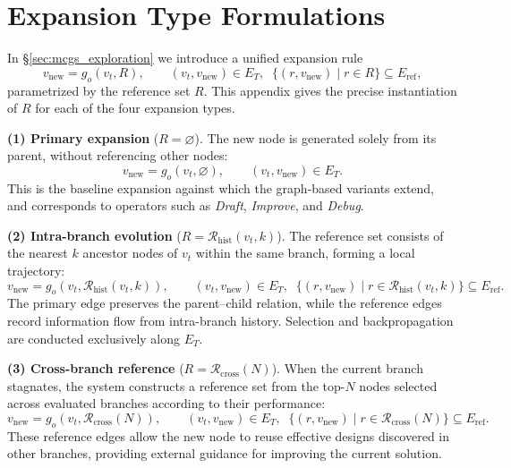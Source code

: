 \section{Expansion Type Formulations}
\label{appen:expansion}

In \S\ref{sec:mcgs_exploration} we introduce a unified expansion rule
\begin{equation*}
v_{\text{new}} = g_{o}(v_{t}, R), \qquad (v_{t}, v_{\text{new}}) \in E_{T}, \;\; \{(r, v_{\text{new}}) \mid r \in R\} \subseteq E_{\text{ref}},
\end{equation*}
parametrized by the reference set $R$. This appendix gives the precise instantiation of $R$ for each of the four expansion types.

\textbf{(1) Primary expansion} ($R = \varnothing$).
The new node is generated solely from its parent, without referencing other nodes:
\begin{equation}
v_{\text{new}} = g_{o}(v_{t}, \varnothing), \qquad (v_{t}, v_{\text{new}}) \in E_{T}.
\end{equation}
This is the baseline expansion against which the graph-based variants extend, and corresponds to operators such as \textit{Draft}, \textit{Improve}, and \textit{Debug}.

\textbf{(2) Intra-branch evolution} ($R = \mathcal{R}_{\text{hist}}(v_t, k)$).
The reference set consists of the nearest $k$ ancestor nodes of $v_t$ within the same branch, forming a local trajectory:
\begin{equation}
v_{\text{new}} = g_{o}(v_{t}, \mathcal{R}_{\text{hist}}(v_{t}, k)), \qquad (v_{t}, v_{\text{new}}) \in E_{T}, \;\; \{(r, v_{\text{new}}) \mid r \in \mathcal{R}_{\text{hist}}(v_t, k)\} \subseteq E_{\text{ref}}.
\end{equation}
The primary edge preserves the parent--child relation, while the reference edges record information flow from intra-branch history. Selection and backpropagation are conducted exclusively along $E_T$.

\textbf{(3) Cross-branch reference} ($R = \mathcal{R}_{\text{cross}}(N)$).
When the current branch stagnates, the system constructs a reference set from the top-$N$ nodes selected across evaluated branches according to their performance:
\begin{equation}
v_{\text{new}} = g_{o}(v_{t}, \mathcal{R}_{\text{cross}}(N)), \qquad (v_{t}, v_{\text{new}}) \in E_{T}, \;\; \{(r, v_{\text{new}}) \mid r \in \mathcal{R}_{\text{cross}}(N)\} \subseteq E_{\text{ref}}.
\end{equation}
These reference edges allow the new node to reuse effective designs discovered in other branches, providing external guidance for improving the current solution.

